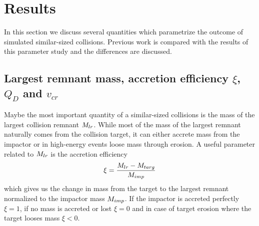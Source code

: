 \section{Results}
In this section we discuss several quantities which parametrize the outcome of simulated similar-sized collisions. Previous work is compared with the results of this parameter study and the differences are discussed. 
\subsection{Largest remnant mass, accretion efficiency $\xi$, $Q_D$ and $v_{cr}$}
Maybe the most important quantity of a similar-sized collisions is the mass of the largest collision remnant $M_{lr}$. While most of the mass of the largest remnant naturally comes from the collision target, it can either accrete mass from the impactor or in high-energy events loose mass through erosion. A useful parameter related to $M_{lr}$ is the accretion efficiency
\begin{equation}
\xi = \frac{M_{lr} - M_{targ}}{M_{imp}}
\end{equation}
which gives us the change in mass from the target to the largest remnant normalized to the impactor mass $M_{imp}$. If the impactor is accreted perfectly $\xi = 1$, if no mass is accreted or lost $\xi = 0$ and in case of target erosion where the target looses mass $\xi < 0$.

